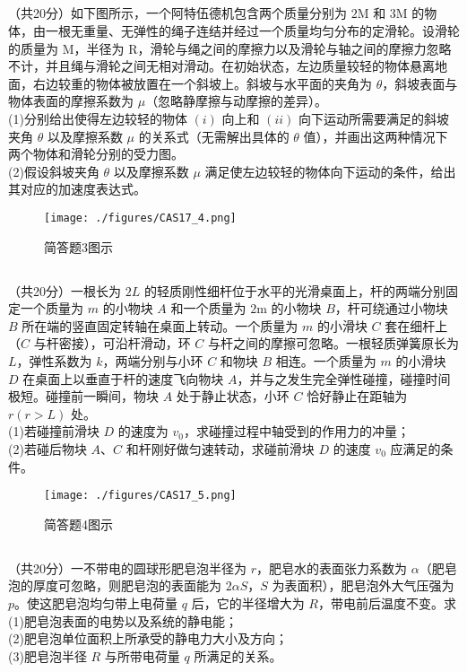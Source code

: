\subsection{ }
（共20分）如下图所示，一个阿特伍德机包含两个质量分别为 $2\mathrm{M}$ 和 $3\mathrm{M}$ 的物体，由一根无重量、无弹性的绳子连结并经过一个质量均匀分布的定滑轮。设滑轮的质量为 $\mathrm{M}$，半径为 $\mathrm{R}$，滑轮与绳之间的摩擦力以及滑轮与轴之间的摩擦力忽略不计，并且绳与滑轮之间无相对滑动。在初始状态，左边质量较轻的物体悬离地面，右边较重的物体被放置在一个斜坡上。斜坡与水平面的夹角为 $\theta$，斜坡表面与物体表面的摩擦系数为 $\mu$（忽略静摩擦与动摩擦的差异）。\\
(1)分别给出使得左边较轻的物体 $(i)$ 向上和 $(ii)$ 向下运动所需要满足的斜坡夹角 $\theta$ 以及摩擦系数 $\mu$ 的关系式（无需解出具体的 $\theta$ 值），并画出这两种情况下两个物体和滑轮分别的受力图。\\
(2)假设斜坡夹角 $\theta$ 以及摩擦系数 $\mu$ 满足使左边较轻的物体向下运动的条件，给出其对应的加速度表达式。\\
\begin{figure}[ht]
\centering
\texttt{[image: ./figures/CAS17\_4.png]}
\caption{简答题3图示} \label{CAS17_fig4}
\end{figure}
\subsection{ }
（共20分）一根长为 $2L$ 的轻质刚性细杆位于水平的光滑桌面上，杆的两端分别固定一个质量为 $m$ 的小物块 $A$ 和一个质量为 $2\mathrm{m}$ 的小物块 $B$，杆可绕通过小物块 $B$ 所在端的竖直固定转轴在桌面上转动。一个质量为 $m$ 的小滑块 $C$ 套在细杆上（$C$ 与杆密接），可沿杆滑动，环 $C$ 与杆之间的摩擦可忽略。一根轻质弹簧原长为 $L$，弹性系数为 $k$，两端分别与小环 $C$ 和物块 $B$ 相连。一个质量为 $m$ 的小滑块 $D$ 在桌面上以垂直于杆的速度飞向物块 $A$，并与之发生完全弹性碰撞，碰撞时间极短。碰撞前一瞬间，物块 $A$ 处于静止状态，小环 $C$ 恰好静止在距轴为 $r(r>L)$ 处。\\
(1)若碰撞前滑块 $D$ 的速度为 $v_{0}$，求碰撞过程中轴受到的作用力的冲量；\\
(2)若碰后物块 $A$、$C$ 和杆刚好做匀速转动，求碰前滑块 $D$ 的速度 $v_{0}$ 应满足的条件。\\
\begin{figure}[ht]
\centering
\texttt{[image: ./figures/CAS17\_5.png]}
\caption{简答题4图示} \label{CAS17_fig5}
\end{figure}
\subsection{ }
（共20分）一不带电的圆球形肥皂泡半径为 $r$，肥皂水的表面张力系数为 $\alpha$（肥皂泡的厚度可忽略，则肥皂泡的表面能为 $2 \alpha S$，$S$ 为表面积），肥皂泡外大气压强为 $p$。使这肥皂泡均匀带上电荷量 $q$ 后，它的半径增大为 $R$，带电前后温度不变。求\\
(1)肥皂泡表面的电势以及系统的静电能；\\
(2)肥皂泡单位面积上所承受的静电力大小及方向；\\
(3)肥皂泡半径 $R$ 与所带电荷量 $q$ 所满足的关系。\\
